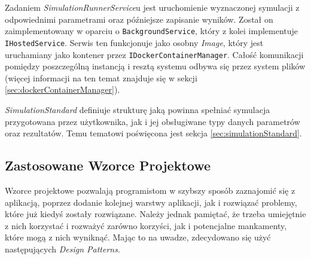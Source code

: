 \par Zadaniem \emph{SimulationRunnerService}u jest uruchomienie wyznaczonej symulacji z odpowiednimi parametrami oraz późniejsze zapisanie wyników. Został on zaimplementowany w oparciu o \texttt{BackgroundService}, który z kolei implementuje \texttt{IHostedService}.\cite{DOTNET_HOSTED_SERVICE} Serwis ten funkcjonuje jako osobny \emph{\docker Image}, który jest uruchamiany jako kontener przez \texttt{IDockerContainerManager}. Całość komunikacji pomiędzy poszczególną instancją i resztą systemu odbywa się przez system plików (więcej informacji na ten temat znajduje się w sekcji \ref{sec:dockerContainerManager}).

\par \emph{SimulationStandard} definiuje strukturę jaką powinna spełniać symulacja przygotowana przez użytkownika, jak i jej obsługiwane typy danych parametrów oraz rezultatów. Temu tematowi poświęcona jest sekcja \ref{sec:simulationStandard}.

\subsection{Zastosowane Wzorce Projektowe}
\label{subsec:zastosowaneWzorceProjektowe}

\par Wzorce projektowe pozwalają programistom w szybszy sposób zaznajomić się z aplikacją, poprzez dodanie kolejnej warstwy aplikacji, jak i rozwiązać problemy, które już kiedyś zostały rozwiązane. Należy jednak pamiętać, że trzeba umiejętnie z nich korzystać i rozważyć zarówno korzyści, jak i potencjalne mankamenty, które mogą z nich wyniknąć. Mając to na uwadze, zdecydowano się użyć następujących \emph{Design Patterns}.

